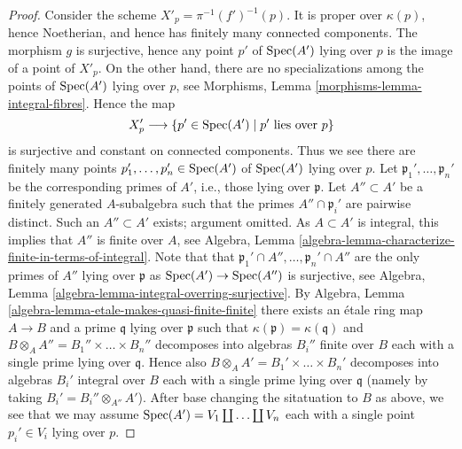 \begin{proof}
\medskip\noindent
Consider the scheme $X'_p = \pi^{-1}(f')^{-1}(p)$.
It is proper over $\kappa(p)$, hence Noetherian, and hence has finitely
many connected components. The morphism $g$ is surjective, hence any
point $p'$ of $\mathop{\rm Spec}(A')$ lying over $p$ is the image
of a point of $X'_p$. On the other hand, there are no specializations
among the points of $\mathop{\rm Spec}(A')$ lying over $p$, see
Morphisms, Lemma \ref{morphisms-lemma-integral-fibres}.
Hence the map
$$
X'_p \longrightarrow \{p' \in \mathop{\rm Spec}(A') \mid p' \text{ lies over } p\}
$$
is surjective and constant on connected components. Thus we see
there are finitely many points $p_1', \ldots, p_n' \in \mathop{\rm Spec}(A')$
of $\mathop{\rm Spec}(A')$ lying over $p$.
Let $\mathfrak p_1', \ldots, \mathfrak p_n'$ be the corresponding
primes of $A'$, i.e., those lying over $\mathfrak p$.
Let $A'' \subset A'$ be a finitely generated $A$-subalgebra such that
the primes $A'' \cap \mathfrak p_i'$ are pairwise distinct.
Such an $A'' \subset A'$ exists; argument omitted.
As $A \subset A'$ is integral, this implies that $A''$ is finite over $A$, see
Algebra, Lemma \ref{algebra-lemma-characterize-finite-in-terms-of-integral}.
Note that that $\mathfrak p_1' \cap A'', \ldots, \mathfrak p_n' \cap A''$
are the only primes of $A''$ lying over $\mathfrak p$ as
$\mathop{\rm Spec}(A') \to \mathop{\rm Spec}(A'')$ is surjective, see
Algebra, Lemma \ref{algebra-lemma-integral-overring-surjective}.
By
Algebra, Lemma \ref{algebra-lemma-etale-makes-quasi-finite-finite}
there exists an \'etale ring map $A \to B$ and a prime $\mathfrak q$ lying
over $\mathfrak p$ such that $\kappa(\mathfrak p) = \kappa(\mathfrak q)$
and $B \otimes_A A'' = B_1'' \times \ldots \times B_n''$
decomposes into algebras $B_i''$ finite over $B$ each with a single prime
lying over $\mathfrak q$. Hence also
$B \otimes_A A' = B_1' \times \ldots \times B_n'$
decomposes into algebras $B_i'$ integral over $B$ each with a single prime
lying over $\mathfrak q$ (namely by taking $B_i' = B_i'' \otimes_{A''} A'$).
After base changing the sitatuation to $B$ as above, we see that we may assume
$\mathop{\rm Spec}(A') = V_1 \coprod \ldots \coprod V_n$
each with a single point $p_i' \in V_i$ lying over $p$.


\end{proof}
